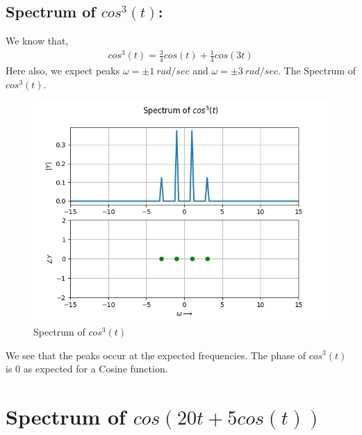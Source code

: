 \documentclass[11pt, a4paper]{article}
\begin{document}
\subsection{Spectrum of $cos^3(t)$:}
We know that,
\begin{gather}
    cos^3(t) = \frac{3}{4}cos(t) + \frac{1}{4}cos(3t)
\end{gather}
Here also, we expect peaks $\omega = \pm 1\ rad/sec$ and $\omega = \pm 3\ rad/sec$. \newline
The Spectrum of $cos^3(t)$.
\begin{figure}[H]
    \centering
    \includegraphics[scale=0.65]{Figure_4.png}
    \caption{Spectrum of $cos^3(t)$}
    \label{fig:cos^3t}
\end{figure}

We see that the peaks occur at the expected frequencies. The phase of $cos^3(t)$ is 0 as expected for a Cosine function.

\section{Spectrum of $cos(20t + 5cos(t))$}
\end{document}
